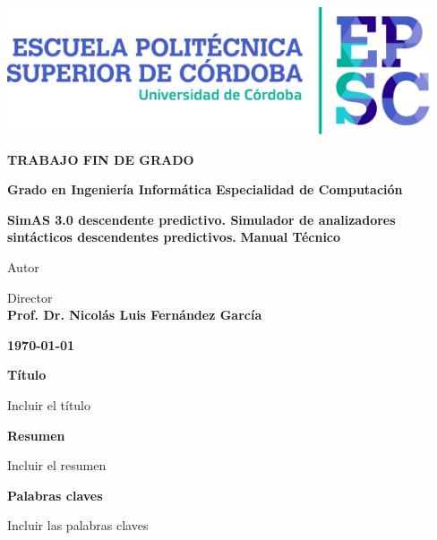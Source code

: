 \documentclass[a4paper,12pt,twoside,final]{book}
\begin{document}
\renewcommand*\listtablename{Índice de tablas}
\renewcommand{\tablename}{Tabla}
\begin{center}
\fontfamily{\sfdefault}\selectfont
\vspace*{2cm}

\vfill
\vfill
\includegraphics[width=12.5cm]{LogotipoEPSC.pdf}
\vfill
\vfill

\large\textbf{\color{epsc:medio}
  TRABAJO FIN DE GRADO
}
\vfill

\Large\textbf{\color{epsc:verde}
  Grado en Ingeniería Informática
}
\vfill
\Large\textbf{\color{epsc:verde}
  Especialidad de Computación
}
\vfill

\Huge\textbf{\color{epsc:oscuro}
  SimAS 3.0 descendente predictivo. Simulador de analizadores sintácticos descendentes predictivos.
}
\vfill
\vfill
\Large\textbf{\color{epsc:verde}
  Manual Técnico
}
\vfill
\vfill


\large{\color{epsc:oscuro}Autor}\\
\textbf{\color{epsc:medio}{D. Antonio Llamas García }}
\vfill

\large{\color{epsc:oscuro} Director }\\
\textbf{\color{epsc:medio} Prof. Dr. Nicolás Luis Fernández García }
\vfill



\textbf{\color{epsc:verde} \monthyeardate\today}
\vfill
\vfill
\vspace{2.7cm}
\end{center}


\cleardoublepage

\thispagestyle{empty}
\pagecolor{white}

\Huge{\textbf{Título }}

\normalsize{Incluir el título}

\Large{\textbf{Resumen }}

\normalsize{Incluir el resumen}


\textbf{Palabras claves}

\normalsize{Incluir las palabras claves}
\end{document}
